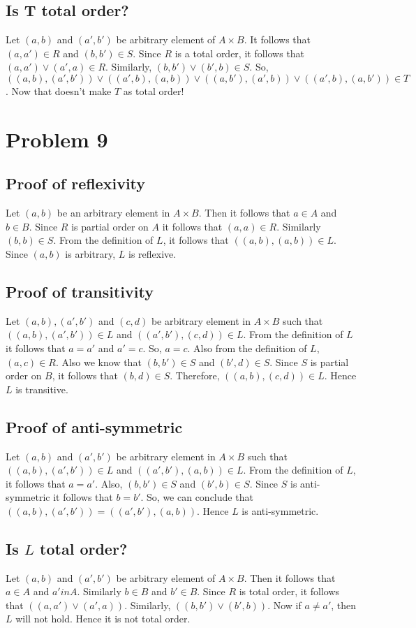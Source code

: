 \documentclass{article}
\begin{document}
\subsection{Is T total order?}
Let $(a,b)$ and $(a',b')$ be arbitrary element of $A \times B$. It
follows that $(a,a') \in R$ and $(b,b') \in S$. Since $R$ is a total
order, it follows that $(a,a') \lor (a',a) \in R$. Similarly, $(b,b')
\lor (b',b) \in S$. So, $((a,b),(a',b')) \lor ((a',b),(a,b)) \lor
((a,b'),(a',b)) \lor ((a',b),(a,b')) \in T$. Now that doesn't make $T$
as total order!

\section{Problem 9}
\subsection{Proof of reflexivity}
Let $(a,b)$ be an arbitrary element in $A \times B$. Then it follows
that $a \in A$ and $b \in B$. Since $R$ is partial order on $A$ it
follows that $(a,a) \in R$. Similarly $(b,b) \in S$. From the
definition of $L$, it follows that $((a,b),(a,b)) \in L$. Since
$(a,b)$ is arbitrary, $L$ is reflexive.

\subsection{Proof of transitivity}
Let $(a,b),(a',b')$ and $(c,d)$ be arbitrary element in $A \times B$
such that $((a,b),(a',b')) \in L$ and $((a',b'),(c,d)) \in L$. From
the definition of $L$ it follows that $a = a'$ and $a' = c$. So, $a =
c$. Also from the definition of $L$, $(a,c) \in R$. Also we know that
$(b,b') \in S$ and $(b',d) \in S$. Since $S$ is partial order on $B$,
it follows that $(b,d) \in S$. Therefore, $((a,b),(c,d)) \in L$. Hence
$L$ is transitive.

\subsection{Proof of anti-symmetric}
Let $(a,b)$ and $(a',b')$ be arbitrary element in $A \times B$ such
that $((a,b),(a',b')) \in L$ and $((a',b'),(a,b)) \in L$. From the
definition of $L$, it follows that $a = a'$. Also, $(b,b') \in S$ and
$(b',b) \in S$. Since $S$ is anti-symmetric it follows that $b = b'$.
So, we can conclude that $((a,b),(a',b')) = ((a',b'),(a,b))$. Hence
$L$ is anti-symmetric.

\subsection{Is $L$ total order?}
Let $(a,b)$ and $(a',b')$ be arbitrary element of $A \times B$. Then
it follows that $a \in A$ and $a' in A$. Similarly $b \in B$ and $b'
\in B$. Since $R$ is total order, it follows that $((a,a') \lor
(a',a))$. Similarly, $((b,b') \lor (b',b))$. Now if $a \neq a'$, then
$L$ will not hold. Hence it is not total order.
\end{document}
